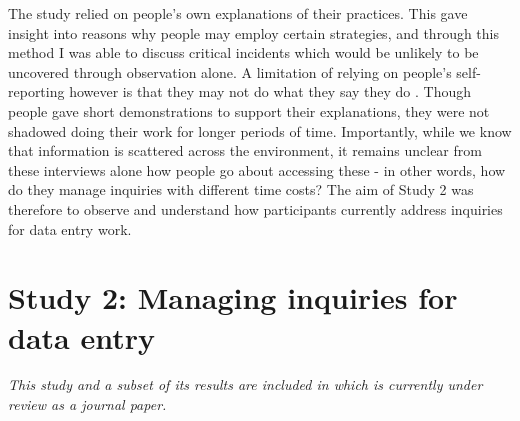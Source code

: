 The study relied on people's own explanations of their practices. This gave insight into reasons why people may employ certain strategies, and through this method I was able to discuss critical incidents which would be unlikely to be uncovered through observation alone. A limitation of relying on people's self-reporting however is that they may not do what they say they do \citep[e.g.][]{Randall2014}. Though people gave short demonstrations to support their explanations, they were not shadowed doing their work for longer periods of time. Importantly, while we know that information is scattered across the environment, it remains unclear from these interviews alone how people go about accessing these - in other words, how do they manage inquiries with different time costs? The aim of Study 2 was therefore to observe and understand how participants currently address inquiries for data entry work.


\section{Study 2: Managing inquiries for data entry}

\textit{This study and a subset of its results are included in \citet{Borghouts2018} which is currently under review as a journal paper.}

